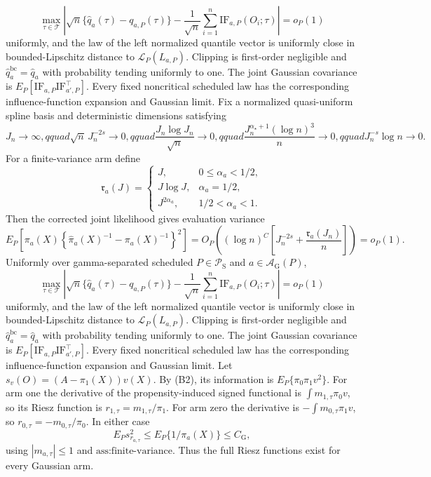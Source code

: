 \[
 \max_{\tau\in\mathcal T}\left|
 \sqrt n\{\widehat q_a(\tau)-q_{a,P}(\tau)\}
 -\frac1{\sqrt n}\sum_{i=1}^n\mathrm{IF}_{a,P}(O_i;\tau)
 \right|=o_P(1)
\]
uniformly, and the law of the left normalized quantile vector is uniformly close in bounded-Lipschitz distance to \(\mathcal L_P(L_{a,P})\).  Clipping is first-order negligible and \(\widehat q_a^{\mathrm{bc}}=\widehat q_a\) with probability tending uniformly to one.  The joint Gaussian covariance is \(E_P[\mathrm{IF}_{a,P}\mathrm{IF}_{a',P}^{\top}]\).  Every fixed noncritical scheduled law has the corresponding influence-function expansion and Gaussian limit.
Fix a normalized quasi-uniform spline basis and deterministic dimensions satisfying
\[
 J_n\to\infty,qquad
 \sqrt n\,J_n^{-2s}\to0,qquad
 \frac{J_n\log J_n}{\sqrt n}\to0,qquad
 \frac{J_n^{\alpha_\star+1}(\log n)^3}{n}\to0,qquad
 J_n^{-s}\log n\to0.
\]
For a finite-variance arm define
\[
 \mathfrak r_{a}(J)=
 \begin{cases}
 J,&0\le\alpha_a<1/2,\\
 J\log J,&\alpha_a=1/2,\\
 J^{2\alpha_a},&1/2<\alpha_a<1.
 \end{cases}
\]
Then the corrected joint likelihood gives evaluation variance
\[
 E_P\!\left[\pi_a(X)\left\{\widehat\pi_a(X)^{-1}-\pi_a(X)^{-1}\right\}^2\right]
 =O_P\!\left((\log n)^C\left[J_n^{-2s}+\frac{\mathfrak r_a(J_n)}n\right]\right)=o_P(1).
\]
Uniformly over gamma-separated scheduled \(P\in\mathcal P_{\mathrm S}\) and \(a\in\mathcal A_{\mathrm G}(P)\),
\[
 \max_{\tau\in\mathcal T}\left|
 \sqrt n\{\widehat q_a(\tau)-q_{a,P}(\tau)\}
 -\frac1{\sqrt n}\sum_{i=1}^n\mathrm{IF}_{a,P}(O_i;\tau)
 \right|=o_P(1)
\]
uniformly, and the law of the left normalized quantile vector is uniformly close in bounded-Lipschitz distance to \(\mathcal L_P(L_{a,P})\).  Clipping is first-order negligible and \(\widehat q_a^{\mathrm{bc}}=\widehat q_a\) with probability tending uniformly to one.  The joint Gaussian covariance is \(E_P[\mathrm{IF}_{a,P}\mathrm{IF}_{a',P}^{\top}]\).  Every fixed noncritical scheduled law has the corresponding influence-function expansion and Gaussian limit.
Let \(s_v(O)=(A-\pi_1(X))v(X)\).  By (B2), its information is \(E_P\{\pi_0\pi_1v^2\}\).  For arm one the derivative of the propensity-induced signed functional is \(\int m_{1,\tau}\pi_0v\), so its Riesz function is \(r_{1,\tau}=m_{1,\tau}/\pi_1\).  For arm zero the derivative is \(-\int m_{0,\tau}\pi_1v\), so \(r_{0,\tau}=-m_{0,\tau}/\pi_0\).  In either case
\[
 E_Ps_{r_{a,\tau}}^2
 \le E_P\{1/\pi_a(X)\}\le C_{\mathrm G},
\tag{G1}
\]
using \(|m_{a,\tau}|\le1\) and \(\text{ass:finite-variance}\).  Thus the full Riesz functions exist for every Gaussian arm.

